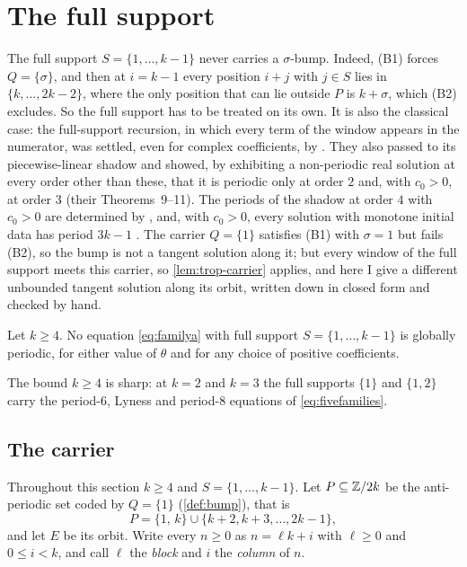 \section{The full support}
\label{sec:fullsupport}

The full support $S=\{1,\dots,k-1\}$ never carries a $\sigma$-bump. Indeed,
(B1) forces $Q=\{\sigma\}$, and then at $i=k-1$ every position $i+j$ with
$j\in S$ lies in $\{k,\dots,2k-2\}$, where the only position that can lie outside $P$ is
$k+\sigma$, which (B2) excludes. So the full support has to be treated on its
own. It is also the classical case: the full-support recursion, in which every
term of the window appears in the numerator, was settled, even for complex
coefficients, by \citet{CsornyeiLaczkovich2001}. They also passed to its
piecewise-linear shadow and showed, by exhibiting a non-periodic real solution
at every order other than these, that it is periodic only at order $2$ and,
with $c_0>0$, at order $3$ (their Theorems~9--11). The periods of the shadow at order $4$ with $c_0>0$ are determined by
\citet{LineroBasNievesRoldan2021}, and, with $c_0>0$, every solution with monotone initial
data has period $3k-1$ \citep{GolombCallan1992}. The carrier $Q=\{1\}$ satisfies (B1) with $\sigma=1$ but fails (B2), so the bump
is not a tangent solution along it; but every window of the full support
meets this carrier, so \autoref{lem:trop-carrier} applies, and here I give a
different unbounded tangent solution along its orbit, written down in closed
form and checked by hand.

\begin{theorem}
\label{thm:fullsupport}
Let $k\ge4$. No equation \eqref{eq:familya} with full support
$S=\{1,\dots,k-1\}$ is globally periodic, for either value of $\theta$ and for any
choice of positive coefficients.
\end{theorem}

The bound $k\ge4$ is sharp: at $k=2$ and $k=3$ the full supports $\{1\}$ and
$\{1,2\}$ carry the period-$6$, Lyness and period-$8$ equations of
\eqref{eq:fivefamilies}.

\subsection{The carrier}
\label{sec:fs-carrier}

Throughout this section $k\ge4$ and $S=\{1,\dots,k-1\}$. Let $P\subseteq\mathbb{Z}/2k$ be
the anti-periodic set coded by $Q=\{1\}$ (\autoref{def:bump}), that is
\[
P=\{1,\,k\}\cup\{k+2,k+3,\dots,2k-1\},
\]
and let $E$ be its orbit. Write every $n\ge0$ as $n=\ell k+i$ with $\ell\ge0$ and
$0\le i<k$, and call $\ell$ the \textit{block} and $i$ the \textit{column} of $n$.

